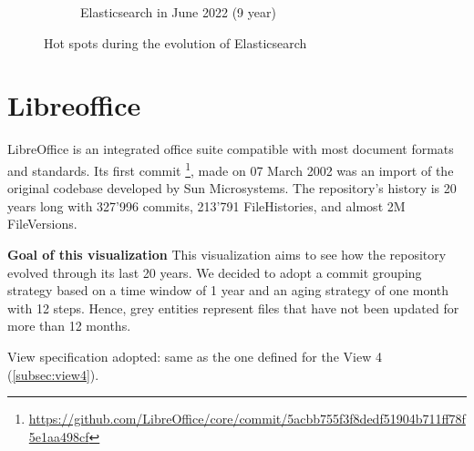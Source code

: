 \begin{figure}[ht]
\begin{subfigure}{0.48\textwidth}
        \caption{Elasticsearch in June 2022 (9 year)} 
        \label{fig:Elastic_V5_V3S6}
    \end{subfigure}
    
    \caption{Hot spots during the evolution of Elasticsearch} 
    \label{fig:Elastic_V5}
\end{figure}


\clearpage
\section{Libreoffice}
LibreOffice is an integrated office suite compatible with most document formats and standards. Its first commit \footnote{\url{https://github.com/LibreOffice/core/commit/5acbb755f3f8dedf51904b711ff78f5e1aa498cf}}, made on 07 March 2002 was an import of the original codebase developed by Sun Microsystems. The repository's history is 20 years long with 327'996 commits, 213'791 FileHistories, and almost 2M FileVersions. 

\textbf{Goal of this visualization}
This visualization aims to see how the repository evolved through its last 20 years. We decided to adopt a commit grouping strategy based on a time window of 1 year and an aging strategy of one month with 12 steps. Hence, grey entities represent files that have not been updated for more than 12 months. 

\bigbreak
View specification adopted: same as the one defined for the View 4 (\autoref{subsec:view4}).

